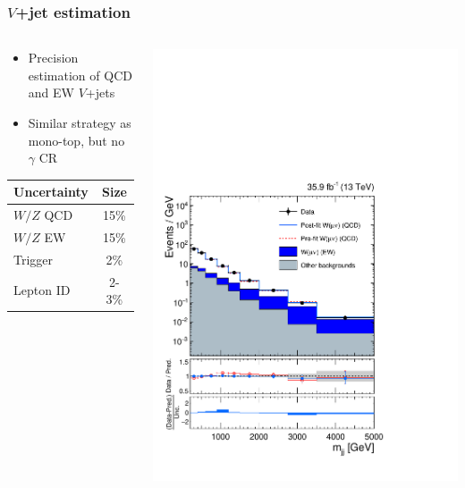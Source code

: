 \documentclass[aspectratio=169,xcolor=dvipsnames,,table,compress]{beamer}
\begin{document}
\begin{frame} \frametitle{$V$+jet estimation}
  \vspace{-5mm}
  \begin{columns}
    \begin{column}{0.33\textwidth}
      \begin{itemize}
        \item Precision estimation of QCD and EW $V$+jets
        \item Similar strategy as mono-top, but no $\gamma$ CR
      \end{itemize}
      \vspace{2mm}
      \centering
      \begin{tabular}{l|c}
        Uncertainty & Size \\
        \hline \hline
        $W/Z$ QCD & 15\% \\
        $W/Z$ EW & 15\% \\
        \hline
        Trigger & 2\% \\
        Lepton ID & 2-3\% \\
      \end{tabular}
    \end{column}
    \begin{column}{0.33\textwidth}
      \centering
      \includegraphics[width=\textwidth]{../figures/vbf/fits/vbf_PULLS_prefit_postfit_singlemuon.pdf}

\end{column}
\end{columns}
\end{frame}
\end{document}
